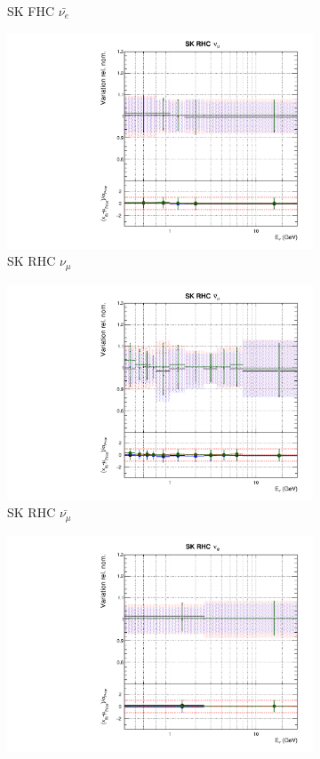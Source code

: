 \begin{figure}
\begin{subfigure}{0.45\textwidth}
  \caption{SK FHC $\bar{\nu_e}$}
\end{subfigure}
\begin{subfigure}{0.45\textwidth}
  \centering
  \includegraphics[width=0.75\linewidth]{figs/hptpcfitsflux_12}
  \caption{SK RHC $\nu_{\mu}$}
\end{subfigure}
\begin{subfigure}{0.45\textwidth}
  \centering
  \includegraphics[width=0.75\linewidth]{figs/hptpcfitsflux_13}
  \caption{SK RHC $\bar{\nu_{\mu}}$}
\end{subfigure}
\begin{subfigure}{0.45\textwidth}
  \centering
  \includegraphics[width=0.75\linewidth]{figs/hptpcfitsflux_14}

\end{subfigure}
\end{figure}
